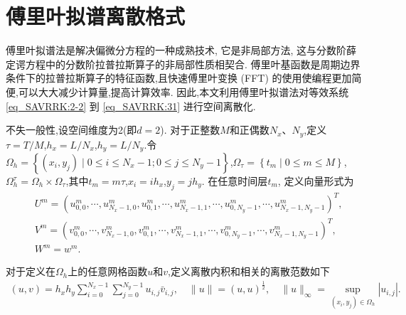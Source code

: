 \section{傅里叶拟谱离散格式}\label{Section_SAVRRK: 3}
傅里叶拟谱法是解决偏微分方程的一种成熟技术, 它是非局部方法,
这与分数阶薛定谔方程中的分数阶拉普拉斯算子的非局部性质相契合.
傅里叶基函数是周期边界条件下的拉普拉斯算子的特征函数,且快速傅里叶变换 (FFT) 的使用使编程更加简便,可以大大减少计算量,提高计算效率.
因此,本文利用傅里叶拟谱法对等效系统 \eqref{eq_SAVRRK:2-2} 到 \eqref{eq_SAVRRK:31} 进行空间离散化.

不失一般性,设空间维度为2(即$d=2$). 对于正整数$M$和正偶数$N_{x}$、$N_{y}$,定义$\tau={T}/{M}$,$h_{x}={L}/{N_{x}}$,$h_{y}={L}/{N_{y}}$.令$\Omega_{h}=\left\{(x_{i}, y_{j}) \mid 0 \leq i \leq N_x-1;0 \leq j \leq N_y-1\right\}$,$\Omega_{\tau}=\left\{t_{m} \mid 0 \leq m \leq M\right\}$,$\Omega_{h}^{\tau}=\Omega_{h} \times \Omega_{\tau}$,其中$t_{m}=m \tau$,$x_{i}=i h_{x}$,$y_{j}=j h_{y}$.
在任意时间层$t_m$, 定义向量形式为
\begin{align}\label{eq_SAVRRK:47}
&U^m=\left(u_{0,0}^m, \cdots, u_{N_{x}-1,0}^m, u_{0,1}^m, \cdots, u_{N_{x}-1,1}^m, \cdots, u_{0, N_{y}-1}^m, \cdots, u_{N_{x}-1, N_{y}-1}^m\right)^{T},\\
&V^m=\left(v_{0,0}^m, \cdots, v_{N_{x}-1,0}^m, v_{0,1}^m, \cdots, v_{N_{x}-1,1}^m, \cdots, v_{0, N_{y}-1}^m, \cdots, v_{N_{x}-1, N_{y}-1}^m\right)^{T},\\
&W^m=w^m.
\end{align}

对于定义在$\Omega_{h}$上的任意网格函数$u$和$v$,定义离散内积和相关的离散范数如下
\begin{align}\label{eq_SAVRRK:48}
(u, v)=h_{x} h_{y} \sum_{i=0}^{N_{x}-1} \sum_{j=0}^{N_{y}-1} u_{i, j} \bar{v}_{i, j},\quad\|u\|=(u, u)^{\frac{1}{2}},\quad\|u\|_{\infty}=\sup _{\left(x_{i}, y_{j}\right) \in \Omega_{h}}\left|u_{i, j}\right|.
\end{align}

